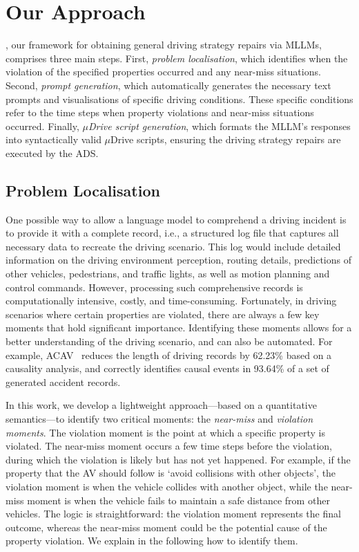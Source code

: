 \section{Our Approach}
\label{sec:our_approach}
\coolname, our framework for obtaining general driving strategy repairs via MLLMs, comprises three main steps. First, \emph{problem localisation}, which identifies when the violation of the specified properties occurred and any near-miss situations. Second, \emph{prompt generation}, which automatically generates the necessary text prompts and visualisations of specific driving conditions. These specific conditions refer to the time steps when property violations and near-miss situations occurred. Finally, \emph{$\mu$Drive script generation}, which formats the MLLM's responses into syntactically valid $\mu$Drive scripts, ensuring the driving strategy repairs are executed by the ADS.



\subsection{Problem Localisation}
One possible way to allow a language model to comprehend a driving incident is to provide it with a complete record, i.e., a structured log file that captures all necessary data to recreate the driving scenario. This log would include detailed information on the driving environment perception, routing details, predictions of other vehicles, pedestrians, and traffic lights, as well as motion planning and control commands.
However, processing such comprehensive records is computationally intensive, costly, and time-consuming. Fortunately, in driving scenarios where certain properties are violated, there are always a few key moments that hold significant importance. Identifying these moments allows for a better understanding of the driving scenario, and can also be automated.
For example, ACAV~\cite{sun2024acav} reduces the length of driving records by 62.23\% based on a causality analysis, and correctly identifies causal events in 93.64\% of a set of generated accident records.


In this work, we develop a lightweight approach---based on a quantitative semantics---to identify two critical moments: the \emph{near-miss} and \emph{violation moments}. The violation moment is the point at which a specific property is violated. The near-miss moment occurs a few time steps before the violation, during which the violation is likely but has not yet happened. For example, if the property that the AV should follow is `avoid collisions with other objects', the violation moment is when the vehicle collides with another object, while the near-miss moment is when the vehicle fails to maintain a safe distance from other vehicles. The logic is straightforward: the violation moment represents the final outcome, whereas the near-miss moment could be the potential cause of the property violation.
We explain in the following how to identify them.



